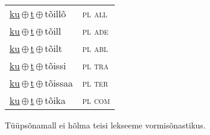 \begin{minipage}{\textwidth}
\begin{sideways}
\begin{tabular}{l l}
\underline{ku}\,$\oplus$\,\underline{t}\,$\oplus$\,tõillõ & \textsc{ pl all } \\
\underline{ku}\,$\oplus$\,\underline{t}\,$\oplus$\,tõill & \textsc{ pl ade } \\
\underline{ku}\,$\oplus$\,\underline{t}\,$\oplus$\,tõilt & \textsc{ pl abl } \\
\underline{ku}\,$\oplus$\,\underline{t}\,$\oplus$\,tõissi & \textsc{ pl tra } \\
\underline{ku}\,$\oplus$\,\underline{t}\,$\oplus$\,tõissaa & \textsc{ pl ter } \\
\underline{ku}\,$\oplus$\,\underline{t}\,$\oplus$\,tõika & \textsc{ pl com } \\
\end{tabular}
\end{sideways}
\label{tab:tüüpsõnamall-kuto}

\end{minipage}

 
\vspace{1em}
\noindent Tüüpsõnamall  ei hõlma teisi lekseeme vormi\-sõnastikus.
